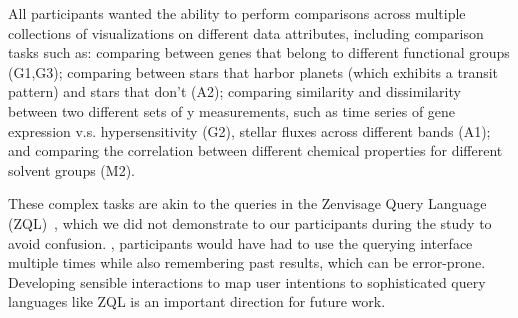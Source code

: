 \par All participants wanted the ability to perform comparisons across multiple collections of visualizations on different data attributes, including comparison tasks such as:
comparing between genes that belong to different functional groups (G1,G3);
comparing between stars that harbor planets (which exhibits a transit pattern) and stars that don't (A2);
comparing similarity and dissimilarity between two different sets of y measurements, such as time series of gene expression v.s. hypersensitivity (G2), stellar fluxes across different bands (A1); and comparing the correlation between different chemical properties for different solvent groups (M2).
\par These complex tasks are akin to the queries in the Zenvisage Query Language (ZQL)~\cite{Siddiqui2017}, which we did not demonstrate to our participants during the study to avoid confusion. ,  participants would have had to use the querying interface multiple times while also remembering past results, which can be error-prone. Developing sensible interactions to map user intentions to sophisticated query languages like ZQL is an important direction for future work.

